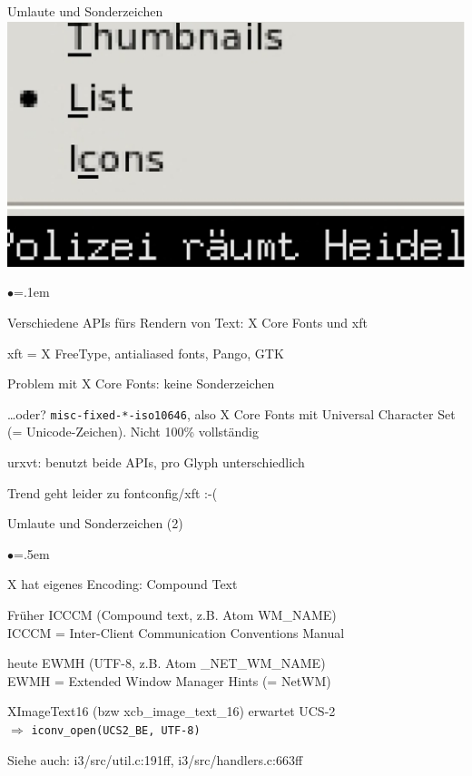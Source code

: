 \documentclass[mode=print,paper=screen,style=jefka]{powerdot}
\newcommand{\isrc}[1]{\begin{center} \footnotesize\ttfamily Siehe auch: #1 \end{center}}
\begin{document}
\begin{slide}[method=direct]{Umlaute und Sonderzeichen}
\includegraphics[width=.5\textwidth]{xft.eps}
\begin{list}{$\bullet$}{\itemsep=.1em}
        \item Verschiedene APIs fürs Rendern von Text: X Core Fonts und xft
        \item xft = X FreeType, antialiased fonts, Pango, GTK
        \item Problem mit X Core Fonts: keine Sonderzeichen
        \item …oder? \texttt{misc-fixed-*-iso10646}, also X Core Fonts mit Universal Character Set (= Unicode-Zeichen). Nicht 100\% vollständig
        \item urxvt: benutzt beide APIs, pro Glyph unterschiedlich
        \item Trend geht leider zu fontconfig/xft :-(
\end{list}
\end{slide}

\begin{slide}[method=direct]{Umlaute und Sonderzeichen (2)}
\begin{list}{$\bullet$}{\itemsep=.5em}
        \item X hat eigenes Encoding: Compound Text
        \item Früher ICCCM (Compound text, z.B. Atom WM\_NAME)\\
        ICCCM = Inter-Client Communication Conventions Manual
        \item heute EWMH (UTF-8, z.B. Atom \_NET\_WM\_NAME)\\
        EWMH = Extended Window Manager Hints (= NetWM)
        \item XImageText16 (bzw xcb\_image\_text\_16) erwartet UCS-2\\
        $\Rightarrow$ \texttt{iconv\_open(UCS2\_BE, UTF-8)}
\end{list}
\isrc{i3/src/util.c:191ff, i3/src/handlers.c:663ff}
\end{slide}
\end{document}
